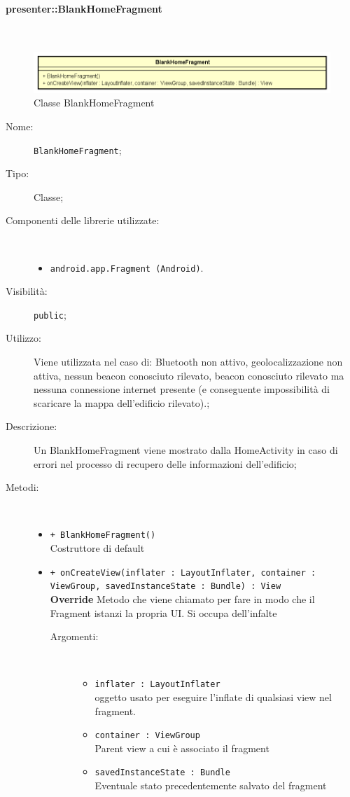 \documentclass[../DefinizioneDiProdotto.tex]{subfiles}
\begin{document}
\paragraph{presenter::BlankHomeFragment}
\
\begin{figure}[H]
	\centering
	\includegraphics[width=\maxwidth]{img/BlankHomeFragment.png}
	\caption{Classe BlankHomeFragment}\label{fig:presenter::BlankHomeFragment} 
\end{figure}
\begin{description}
	\item[Nome:] \texttt{BlankHomeFragment};
	\item[Tipo:] Classe;
	\item[Componenti delle librerie utilizzate:] \
\begin{itemize}
\item \texttt{android.app.Fragment (Android)}.
\end{itemize}
	\item[Visibilità:] \texttt{public};
	\item[Utilizzo:] Viene utilizzata nel caso di: Bluetooth non attivo, geolocalizzazione non attiva, nessun beacon conosciuto rilevato, beacon conosciuto rilevato ma nessuna connessione internet presente (e conseguente impossibilità di scaricare la mappa dell'edificio rilevato).;
	\item[Descrizione:] Un BlankHomeFragment viene mostrato dalla HomeActivity in caso di errori nel processo di recupero delle informazioni dell'edificio;
	\item[Metodi:] \
	\begin{itemize}
		\item \texttt{+ BlankHomeFragment()}\\
		Costruttore di default
		\item \texttt{+ onCreateView(inflater : LayoutInflater, container : ViewGroup, savedInstanceState : Bundle) : View}\\
		\textbf{Override} Metodo che viene chiamato per fare in modo che il Fragment istanzi la propria UI. Si occupa dell'infalte
		\begin{description}
			\item[Argomenti:] \
			\begin{itemize}
				\item \texttt{inflater : LayoutInflater}\\
				oggetto usato per eseguire l'inflate di qualsiasi view nel fragment.\item \texttt{container : ViewGroup}\\
				Parent view a cui è associato il fragment\item \texttt{savedInstanceState : Bundle}\\
				Eventuale stato precedentemente salvato del fragment\end{itemize}
		\end{description}
	\end{itemize}
\end{description}
\end{document}
